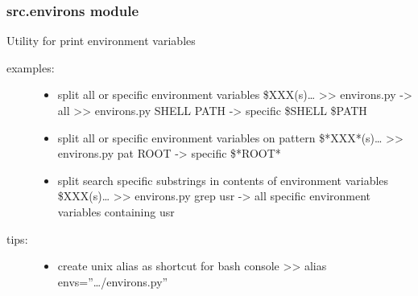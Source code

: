 \documentclass[a4paper,10pt,english]{sphinxmanual}
\begin{document}
\subsubsection{src.environs module}
\label{\detokenize{apidoc_src/src:module-src.environs}}\label{\detokenize{apidoc_src/src:src-environs-module}}
Utility for print environment variables
\begin{description}
\item[{examples: }] \leavevmode\begin{itemize}
\item {} 
split all or specific environment variables \$XXX(s)…
\textgreater{}\textgreater{} environs.py -\textgreater{} all
\textgreater{}\textgreater{} environs.py SHELL PATH -\textgreater{} specific \$SHELL \$PATH

\item {} 
split all or specific environment variables on pattern \$*XXX*(s)…
\textgreater{}\textgreater{} environs.py \textendash{}pat ROOT -\textgreater{} specific \$*ROOT*

\item {} 
split search specific substrings in contents of environment variables \$XXX(s)…
\textgreater{}\textgreater{} environs.py \textendash{}grep usr  -\textgreater{} all specific environment variables containing usr

\end{itemize}

\item[{tips:}] \leavevmode\begin{itemize}
\item {} 
create unix alias as shortcut for bash console
\textgreater{}\textgreater{} alias envs=”…/environs.py”

\end{itemize}

\end{description}

\begin{fulllineitems}
\label{\detokenize{apidoc_src/src:src.environs.print_grep_environs}}
\end{fulllineitems}


\begin{fulllineitems}
\label{\detokenize{apidoc_src/src:src.environs.print_split_environs}}
\end{fulllineitems}
\end{document}
